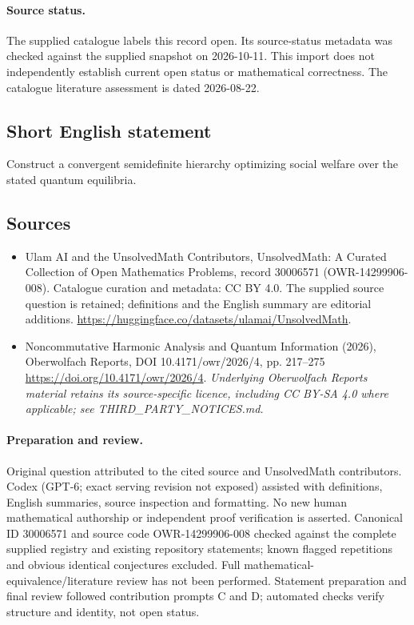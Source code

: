 \documentclass[11pt]{article}
\begin{document}
\paragraph{Source status.}
The supplied catalogue labels this record open. Its source-status metadata was checked against the supplied snapshot on 2026-10-11. This import does not independently establish current open status or mathematical correctness. The catalogue literature assessment is dated 2026-08-22.
\subsection{Short English statement}
Construct a convergent semidefinite hierarchy optimizing social welfare over the stated quantum equilibria.
\subsection{Sources}
\begin{itemize}
\item[\hypertarget{source:30006571:1}{S1}] Ulam AI and the UnsolvedMath Contributors, UnsolvedMath: A Curated Collection of Open Mathematics Problems, record 30006571 (OWR-14299906-008). Catalogue curation and metadata: CC BY 4.0. The supplied source question is retained; definitions and the English summary are editorial additions.
\url{https://huggingface.co/datasets/ulamai/UnsolvedMath}.
\item[\hypertarget{source:30006571:2}{S2}] Noncommutative Harmonic Analysis and Quantum Information (2026), Oberwolfach Reports, DOI 10.4171/owr/2026/4, pp. 217--275
\url{https://doi.org/10.4171/owr/2026/4}.
\textit{Underlying Oberwolfach Reports material retains its source-specific licence, including CC BY-SA 4.0 where applicable; see THIRD\_PARTY\_NOTICES.md.}
\end{itemize}
\paragraph{Preparation and review.}
Original question attributed to the cited source and UnsolvedMath contributors. Codex (GPT-6; exact serving revision not exposed) assisted with definitions, English summaries, source inspection and formatting. No new human mathematical authorship or independent proof verification is asserted. Canonical ID 30006571 and source code OWR-14299906-008 checked against the complete supplied registry and existing repository statements; known flagged repetitions and obvious identical conjectures excluded. Full mathematical-equivalence/literature review has not been performed. Statement preparation and final review followed contribution prompts C and D; automated checks verify structure and identity, not open status.
\label{end:30006571}
\end{document}
